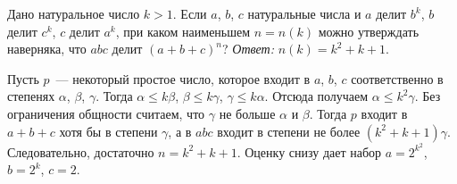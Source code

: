 \problem
Дано натуральное число $k > 1$.
Если $a$, $b$, $c$ натуральные числа и
$a$ делит $b^k$, $b$ делит $c^k$, $c$ делит $a^k$,
при каком наименьшем $n = n(k)$ можно утверждать наверняка, что
$a b c$ делит $(a + b + c)^n$?
\solution
\emph{Ответ:} $n(k) = k^2 + k + 1$.
\par
Пусть $p$~--- некоторый простое число, которое входит в $a$, $b$, $c$
соответственно в степенях $\alpha$, $\beta$, $\gamma$.
Тогда
$\alpha \leq k \beta$, $\beta \leq k \gamma$, $\gamma \leq k \alpha$.
Отсюда получаем $\alpha \leq k^2 \gamma$.
Без ограничения общности считаем, что $\gamma$ не больше $\alpha$ и $\beta$.
Тогда $p$ входит в $a + b + c$ хотя бы в степени $\gamma$, а в $a b c$ входит в
степени не более $(k^2 + k + 1) \gamma$.
Следовательно, достаточно $n = k^2 + k + 1$.
Оценку снизу дает набор $a = 2^{k^2}$, $b = 2^k$, $c = 2$.
\endproblem
